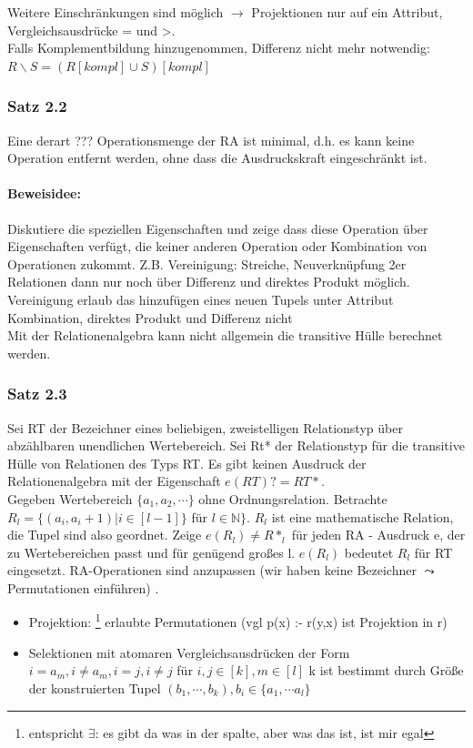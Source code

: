 \documentclass[12pt, a4paper]{article}
\begin{document}
Weitere Einschränkungen sind möglich $\rightarrow$ Projektionen nur auf ein Attribut, Vergleichsausdrücke = und >. \\
Falls Komplementbildung hinzugenommen, Differenz nicht mehr notwendig: \\
$R \backslash S = (R[kompl] \cup S)[kompl]$

\subsubsection*{Satz 2.2}
Eine derart ??? Operationsmenge der RA ist minimal, d.h. es kann keine Operation entfernt werden, ohne dass die Ausdruckskraft eingeschränkt ist.

\paragraph*{Beweisidee:} Diskutiere die speziellen Eigenschaften und zeige dass diese Operation über Eigenschaften verfügt, die keiner anderen Operation oder Kombination von Operationen zukommt. Z.B. Vereinigung: Streiche, Neuverknüpfung 2er Relationen dann nur noch über Differenz und direktes Produkt möglich. Vereinigung erlaub das hinzufügen eines neuen Tupels unter Attribut Kombination, direktes Produkt und Differenz nicht \\

Mit der Relationenalgebra kann nicht allgemein die transitive Hülle berechnet werden.

\subsubsection*{Satz 2.3}
Sei RT der Bezeichner eines beliebigen, zweistelligen Relationstyp über abzählbaren unendlichen Wertebereich. Sei Rt* der Relationstyp für die transitive Hülle von Relationen des Typs RT. Es gibt keinen Ausdruck  der Relationenalgebra mit der Eigenschaft $e(RT) ? = RT*$. \\

Gegeben Wertebereich $\{a_1, a_2, \cdots \}$ ohne Ordnungsrelation. Betrachte $R_l = \{ (a_i, a_i+1) | i \in [l-1] \}$ für $l \in \mathbb{N} \}$. $R_l$ ist eine mathematische Relation, die Tupel sind also geordnet. Zeige $e(R_l) \neq R*_l$ für jeden RA - Ausdruck e, der zu Wertebereichen passt und für genügend großes l. $e(R_l)$ bedeutet $R_l$ für RT eingesetzt. RA-Operationen sind anzupassen (wir haben keine Bezeichner $\leadsto$ Permutationen einführen) .
\begin{itemize}
	\item Projektion: \footnote{entspricht $\exists$: es gibt da was in der spalte, aber was das ist, ist mir egal} erlaubte Permutationen (vgl p(x) :- r(y,x) ist Projektion in r)
	\item Selektionen mit atomaren Vergleichsausdrücken der Form $i = a_m, i \neq a_m, i = j, i \neq j$ für $i,j \in [k], m \in [l]$ k ist bestimmt durch Größe der konstruierten Tupel $(b_1, \cdots, b_k), b_i \in \{a_1, \cdots a_l \}$
\end{itemize}
\end{document}
